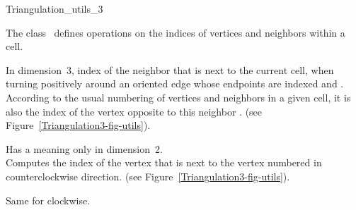 

\begin{ccRefClass}{Triangulation_utils_3}  %


\ccDefinition
  
The class \ccRefName\ defines operations on the indices of vertices
and neighbors within a cell.



{In dimension~3, index of the neighbor  that is next to the current cell,
when turning positively around an oriented edge whose endpoints are
indexed  and . According to the usual numbering of
vertices and neighbors in a given cell, it is also the index of the vertex 
opposite to this neighbor . (see Figure~\ref{Triangulation3-fig-utils}).
}

{Has a meaning only in dimension~2.\\
 Computes the index of the vertex that is next to the vertex numbered
 in counterclockwise direction. (see
Figure~\ref{Triangulation3-fig-utils}).  
}

{Same for clockwise.}


\end{ccRefClass}
